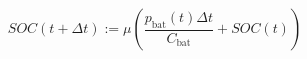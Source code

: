 \begin{equation}
	SOC(t+\Delta t) := \mu\left(\frac{p_\text{bat}(t)\Delta t}{C_\text{bat}} + SOC(t)\right)
	\label{ch1:equ:next-state-of-charge}
\end{equation}